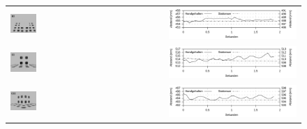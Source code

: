   \begin{figure}[H]
    \centering
   \begin{tabular}{lr}
    \includegraphics[width=0.24\textwidth]{../graphics/position/trackimg_stationary_B.png} & 
   \includegraphics[width=0.75\textwidth]{../graphics/position/graph_stage_eval_both_B_0_distance.svg} \\
    \includegraphics[width=0.24\textwidth]{../graphics/position/trackimg_stationary_C.png} &
   \includegraphics[width=0.75\textwidth]{../graphics/position/graph_stage_eval_both_C_0_distance.svg} \\
    \includegraphics[width=0.24\textwidth]{../graphics/position/trackimg_stationary_C2.png} &
    \includegraphics[width=0.75\textwidth]{../graphics/position/graph_stage_eval_both_C2_0_distance.svg} \\
   \end{tabular}

\end{figure}
